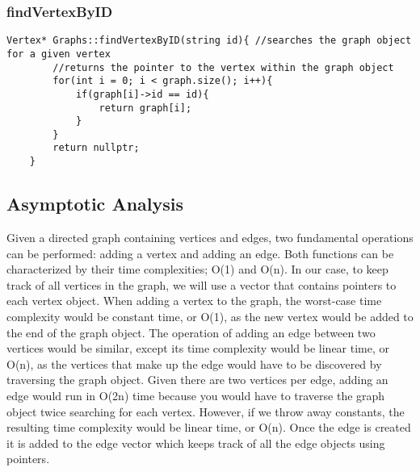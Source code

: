 \documentclass[letterpaper, 10pt,DIV=13]{scrartcl}
\numberwithin{equation}{section} %
\numberwithin{figure}{section} %
\numberwithin{table}{section} %
\begin{document}
\subsubsection*{findVertexByID}
    \lstset{numbers=left, numberstyle=\tiny, stepnumber=1, numbersep=5pt, basicstyle=\footnotesize\ttfamily}
    \begin{lstlisting}[frame=single, ]
    Vertex* Graphs::findVertexByID(string id){ //searches the graph object for a given vertex
        //returns the pointer to the vertex within the graph object
        for(int i = 0; i < graph.size(); i++){
            if(graph[i]->id == id){
                return graph[i];
            }
        }
        return nullptr;
    }
\end{lstlisting}

\subsection{Asymptotic Analysis}
Given a directed graph containing vertices and edges, two fundamental operations can be performed: adding a vertex and adding an edge. Both functions can be characterized by their time complexities; O(1) and O(n). In our case, to keep track of all vertices in the graph, we will use a vector that contains pointers to each vertex object. When adding a vertex to the graph, the worst-case time complexity would be constant time, or O(1), as the new vertex would be added to the end of the graph object. The operation of adding an edge between two vertices would be similar, except its time complexity would be linear time, or O(n), as the vertices that make up the edge would have to be discovered by traversing the graph object. Given there are two vertices per edge, adding an edge would run in O(2n) time because you would have to traverse the graph object twice searching for each vertex. However, if we throw away constants, the resulting time complexity would be linear time, or O(n). Once the edge is created it is added to the edge vector which keeps track of all the edge objects using pointers.




\pagebreak

\end{document}
